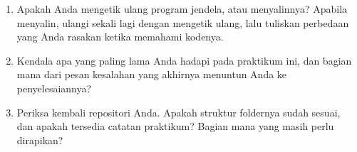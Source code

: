\begin{refleksibox}
\begin{enumerate}
  \item Apakah Anda mengetik ulang program jendela, atau menyalinnya?
        Apabila menyalin, ulangi sekali lagi dengan mengetik ulang, lalu
        tuliskan perbedaan yang Anda rasakan ketika memahami kodenya.
  \item Kendala apa yang paling lama Anda hadapi pada praktikum ini, dan
        bagian mana dari pesan kesalahan yang akhirnya menuntun Anda ke
        penyelesaiannya?
  \item Periksa kembali repositori Anda. Apakah struktur foldernya sudah
        sesuai, dan apakah tersedia catatan praktikum? Bagian mana yang masih
        perlu dirapikan?
\end{enumerate}
\end{refleksibox}
